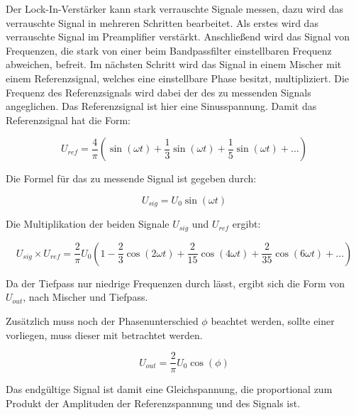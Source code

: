Der Lock-In-Verstärker kann stark verrauschte Signale messen, dazu wird das verrauschte Signal in mehreren Schritten bearbeitet. Als erstes wird das verrauschte Signal im Preamplifier verstärkt. Anschließend wird das Signal von Frequenzen, die stark von einer beim Bandpassfilter einstellbaren Frequenz abweichen, befreit.
Im nächsten Schritt wird das Signal in einem Mischer mit einem
Referenzsignal, welches eine einstellbare Phase besitzt, multipliziert. Die Frequenz des Referenzsignals wird dabei der des zu messenden Signals angeglichen. Das Referenzsignal ist hier eine Sinusspannung. 
Damit das Referenzsignal hat die Form:

\begin{equation}
  \label{eq:ref}
  U_{ref} = \frac{4}{\pi} \left( \sin(\omega t) + \frac{1}{3} \sin(\omega t) + \frac{1}{5} \sin(\omega t) + ... \right)
\end{equation}

Die Formel für das zu messende Signal ist gegeben durch:

\begin{equation}
  \label{eq:sig}
  U_{sig} = U_{0} \sin(\omega t)
\end{equation}

Die Multiplikation der beiden Signale $U_{sig}$ und $U_{ref}$ ergibt:

\begin{equation*}
  U_{sig} \times U_{ref} = \frac{2}{\pi} U_{0} \left(1 - \frac{2}{3} \cos(2\omega t) + \frac{2}{15} \cos(4\omega t) + \frac{2}{35} \cos(6\omega t) + ... \right)
\end{equation*}

Da der Tiefpass nur niedrige Frequenzen durch lässt, ergibt sich die Form von $U_{out}$, nach Mischer und Tiefpass.

Zusätzlich muss noch der Phasenunterschied $\phi$ beachtet werden, sollte einer vorliegen, muss dieser mit betrachtet werden.

\begin{equation}
  \label{eq:Uout}
   U_{out} = \frac{2}{\pi} U_{0} \cos(\phi)
\end{equation}

Das endgültige Signal ist damit eine Gleichspannung, die proportional zum
Produkt der Amplituden der Referenzspannung und des Signals ist.
